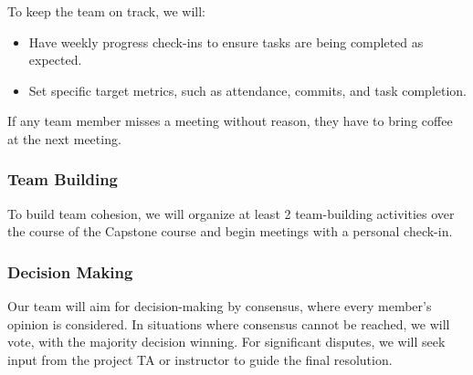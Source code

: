 \documentclass{article}
\begin{document}
To keep the team on track, we will:
\begin{itemize}
    \item Have weekly progress check-ins to ensure tasks are being completed as expected.
    \item Set specific target metrics, such as attendance, commits, and task completion. 
\end{itemize}

If any team member misses a meeting without reason, they have to bring coffee at the next meeting.

\subsubsection*{Team Building}

To build team cohesion, we will organize at least 2 team-building activities over the course of the Capstone course and begin meetings with a personal check-in.

\subsubsection*{Decision Making} 

Our team will aim for decision-making by consensus, where every member's opinion is considered. In situations where consensus cannot be reached, we will vote, with the majority decision winning. For significant disputes, we will seek input from the project TA or instructor to guide the final resolution.
\end{document}
